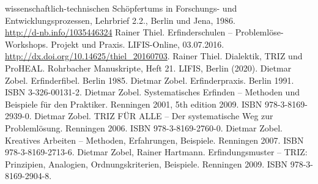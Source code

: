 \documentclass[11pt,a4paper]{article}
\begin{document}
\begin{thebibliography}{xxx}
{    wissenschaftlich-technischen Schöpfertums in Forschungs- und
    Entwicklungsprozessen}, Lehrbrief 2.2., Berlin und Jena,
  1986.\\ \url{http://d-nb.info/1035446324}
 Rainer Thiel.  Erfinderschulen – Problemlöse-Workshops.
  Projekt und Praxis. LIFIS-Online, 03.07.2016.
  \url{http://dx.doi.org/10.14625/thiel_20160703}.
 Rainer Thiel.  Dialektik, TRIZ und ProHEAL. Rohrbacher
   Manuskripte, Heft 21. LIFIS, Berlin (2020).
 Dietmar Zobel. Erfinderfibel. Berlin 1985.
 Dietmar Zobel. Erfinderpraxis. Berlin 1991. ISBN
  3-326-00131-2.
 Dietmar Zobel. Systematisches Erfinden -- Methoden und
  Beispiele für den Praktiker. Renningen 2001, 5th edition 2009. ISBN
  978-3-8169-2939-0.
 Dietmar Zobel. TRIZ FÜR ALLE -- Der systematische Weg zur
  Problemlösung. Renningen 2006. ISBN 978-3-8169-2760-0.
 Dietmar Zobel. Kreatives Arbeiten – Methoden, Erfahrungen,
  Beispiele.  Renningen 2007. ISBN 978-3-8169-2713-6. 
 Dietmar Zobel, Rainer Hartmann. Erfindungsmuster -- TRIZ:
  Prinzipien, Analogien, Ordnungskriterien, Beispiele.  Renningen 2009. ISBN
  978-3-8169-2904-8.
\end{thebibliography}
\end{document}
